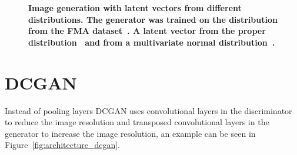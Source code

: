     \begin{figure}[h]
        \centering
        \caption[Image generation with latent vectors from different distributions]
        {
            \textbf{Image generation with latent vectors from different distributions. The generator was trained on the distribution from the FMA dataset~\cite{FMA}. A latent vector from the proper distribution~ and from a multivariate normal distribution~.}
        }
        \label{fig:distribution}
    \end{figure}
    
    \section{DCGAN}

        Instead of pooling layers DCGAN uses convolutional layers in the discriminator to reduce the image resolution and transposed convolutional layers in the generator to increase the image resolution, an example can be seen in Figure~\ref{fig:architecture_dcgan}.
        
